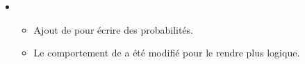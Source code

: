 \documentclass[12pt,a4paper]{book}
\begin{document}
\begin{description}
\begin{itemize}[itemsep=.5em]
    
    
    
        \item {}
        \begin{itemize}[itemsep=.5em]
            \item Ajout de  pour écrire des probabilités.
    
    		\item Le comportement de  a été modifié pour le rendre plus logique.
        \end{itemize}
    \end{itemize}


\end{description}
\end{document}
